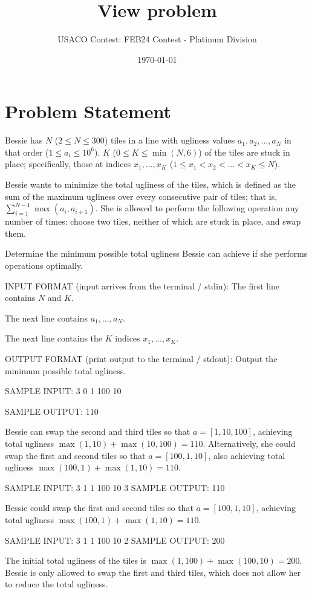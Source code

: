 \documentclass[12pt]{article}
\title{View problem}
\author{USACO Contest: FEB24 Contest - Platinum Division}
\date{\today}
\begin{document}
\maketitle

\section*{Problem Statement}


Bessie has $N$ ($2\le N\le 300$) tiles in a line with ugliness values 
$a_1, a_2, \dots, a_N$ in that order ($1\le a_i\le 10^6$). $K$
($0\le K\le \min(N,6)$) of the tiles are stuck in place; specifically, those at
indices $x_1,\dots, x_K$ ($1\le x_1 < x_2<\dots< x_K\le N$). 

Bessie wants to minimize the total ugliness of the tiles, which is defined as
the sum of the maximum ugliness over every consecutive pair of tiles; that is,
$\sum_{i=1}^{N-1}\max(a_i,a_{i+1})$. She is allowed to perform the following
operation any number of times: choose two tiles, neither of which are stuck in
place, and swap them. 

Determine the minimum possible total ugliness Bessie can achieve if she performs
operations optimally.

INPUT FORMAT (input arrives from the terminal / stdin):
The first line contains $N$ and $K$.

The next line contains $a_1,\dots,a_N$.

The next line contains the $K$ indices $x_1,\dots,x_K$.

OUTPUT FORMAT (print output to the terminal / stdout):
Output the minimum possible total ugliness.

SAMPLE INPUT:
3 0
1 100 10

SAMPLE OUTPUT: 
110

Bessie can swap the second and third tiles so that $a=[1,10,100]$, achieving
total ugliness $\max(1,10)+\max(10,100)=110$. Alternatively, she could swap the
first and second tiles so that $a=[100,1,10]$, also achieving  total ugliness
$\max(100,1)+\max(1,10)=110$.

SAMPLE INPUT:
3 1
1 100 10
3
SAMPLE OUTPUT: 
110

Bessie could swap the first and second tiles so that $a=[100,1,10]$, achieving 
total ugliness $\max(100,1)+\max(1,10)=110$.

SAMPLE INPUT:
3 1
1 100 10
2
SAMPLE OUTPUT: 
200

The initial total ugliness of the tiles is $\max(1,100)+\max(100,10)=200$.
Bessie is only allowed to swap the first and third tiles, which does not allow
her to reduce the total ugliness.
\end{document}
